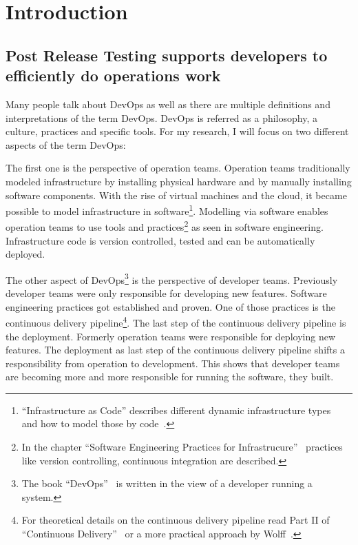 \chapter{Introduction}
\section{Post Release Testing supports developers to efficiently do operations work}

Many people talk about DevOps as well as there are multiple definitions and interpretations of the term DevOps. DevOps is referred as a philosophy, a culture, practices and specific tools. For my research, I will focus on two different aspects of the term DevOps:

The first one is the perspective of operation teams. Operation teams traditionally modeled infrastructure by installing physical hardware and by manually installing software components. With the rise of virtual machines and the cloud, it became possible to model infrastructure in software\footnote{``Infrastructure as Code'' describes different dynamic infrastructure types~\cite[p. 30]{infra_as_code} and how to model those by code~\cite[p. 42]{infra_as_code}.}. Modelling via software enables operation teams to use tools and practices\footnote{In the chapter ``Software Engineering Practices for Infrastrucure''~\cite[p. 179-194]{infra_as_code} practices like version controlling, continuous integration are described.} as seen in software engineering. Infrastructure code is version controlled, tested and can be automatically deployed.

The other aspect of DevOps\footnote{The book ``DevOps''~\cite{devops} is written in the view of a developer running a system.} is the perspective of developer teams. Previously developer teams were only responsible for developing new features. Software engineering practices got established and proven. One of those practices is the continuous delivery pipeline\footnote{For theoretical details on the continuous delivery pipeline read Part II of ``Continuous Delivery''~\cite[p. 103-140]{continuous_delivery} or a more practical approach by Wolff~\cite{continuous_delivery2}.}. The last step of the continuous delivery pipeline is the deployment. Formerly operation teams were responsible for deploying new features. The deployment as last step of the continuous delivery pipeline shifts a responsibility from operation to development. This shows that developer teams are becoming more and more responsible for running the software, they built.

